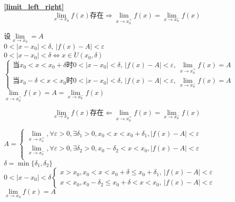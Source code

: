 \textbf{\large \ref{limit_left_right}}
$$\lim\limits_{x\to x_0}f(x)\mbox{存在}\Rightarrow \lim\limits_{x\to x_0^+}f(x)=\lim\limits_{x\to x_0^-}f(x)$$
\begin{center}
    设$\lim\limits_{x\to x_0}=A$\\
    $0<\left|x-x_0\right|<\delta,\ \left|f(x)-A\right|<\varepsilon$\\
    $0<\left|x-x_0\right|<\delta\Leftrightarrow x\in \mathring{U}(x_0,\delta)$
    $\begin{cases}
        \mbox{当}x_0<x<x_0+\delta\mbox{时}0<\left|x-x_0\right|<\delta,\ \left|f(x)-A\right|<\varepsilon,\ \lim\limits_{x\to x_0^+}f(x)=A\\
        \mbox{当}x_0-\delta<x<x_0\mbox{时}0<\left|x-x_0\right|<\delta,\ \left|f(x)-A\right|<\varepsilon,\ \lim\limits_{x\to x_0^-}f(x)=A
    \end{cases}$
    $\lim\limits_{x\to x_0^+}f(x)=A =\lim\limits_{x\to x_0^-}f(x)$
\end{center}
$$\lim\limits_{x\to x_0}f(x)\mbox{存在}\Leftarrow\lim\limits_{x\to x_0^+}f(x)=\lim\limits_{x\to x_0^-}f(x)$$
\begin{center}
    $A=\begin{cases}
    \lim\limits_{x\to x_o^+},\forall\varepsilon>0,\exists\delta_1>0,x_0<x<x_0+\delta_1,\left|f(x)-A\right|<\varepsilon\\
    \lim\limits_{x\to x_o^-},\forall\varepsilon>0,\exists\delta_2>0,x_0-\delta_2<x<x_0,\left|f(x)-A\right|<\varepsilon\\
    \end{cases}$\\
    $\delta = \min\{\delta_1,\delta_2\}$\\
    $0<\left|x-x_0\right|<\delta\begin{cases}
        x>x_0,x_0<x<x_0+\delta\leqslant x_0+\delta_1,\  \left|f(x)-A\right|<\varepsilon\\
        x<x_0,x_0-\delta_2\leqslant x_0+\delta<x<x_0,\ \left|f(x)-A\right|<\varepsilon
    \end{cases}$\\
    $\lim\limits_{x\to x_0}f(x)=A$
\end{center}

